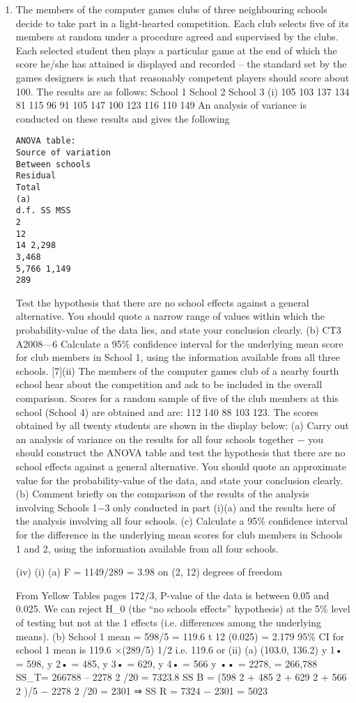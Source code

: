 \documentclass[a4paper,12pt]{article}
\begin{document}
\begin{enumerate}
\item The members of the computer games clubs of three neighbouring schools decide to take part in a light-hearted competition. Each club selects five of its members at random under a procedure agreed and supervised by the clubs. Each selected student
then plays a particular game at the end of which the score he/she has attained is displayed and recorded – the standard set by the games designers is such that reasonably competent players should score about 100.
The results are as follows:
School 1
School 2
School 3
(i)
105
103
137
134
81
115
96
91
105
147
100
123
116
110
149
An analysis of variance is conducted on these results and gives the following
\begin{verbatim}
ANOVA table:
Source of variation
Between schools
Residual
Total
(a)
d.f. SS MSS
2
12
14 2,298
3,468
5,766 1,149
289
\end{verbatim}
Test the hypothesis that there are no school effects against a general alternative.
You should quote a narrow range of values within which the probability-value of the data lies, and state your conclusion clearly.
(b)
CT3 A2008—6
Calculate a 95\% confidence interval for the underlying mean score for club members in School 1, using the information available from all
three schools.
[7](ii)
The members of the computer games club of a nearby fourth school hear about
the competition and ask to be included in the overall comparison. Scores for a random sample of five of the club members at this school (School 4) are
obtained and are:
112 140 88 103 123.
The scores obtained by all twenty students are shown in the display below:
(a)
Carry out an analysis of variance on the results for all four schools together − you should construct the ANOVA table and test the
hypothesis that there are no school effects against a general alternative.
You should quote an approximate value for the probability-value of the data, and state your conclusion clearly.
(b) Comment briefly on the comparison of the results of the analysis
involving Schools 1−3 only conducted in part (i)(a) and the results here of the analysis involving all four schools.
(c) Calculate a 95\% confidence interval for the difference in the underlying mean scores for club members in Schools 1 and 2, using the
information available from all four schools.

(iv)
(i)
(a)
F = 1149/289 = 3.98 on (2, 12) degrees of freedom

From Yellow Tables pages 172/3, P-value of the data is between 0.05 and 0.025.
We can reject H_0 (the “no schools effects” hypothesis) at the 5\% level of testing but not at the 1%
effects (i.e. differences among the underlying means).
(b)
School 1 mean = 598/5 = 119.6
t 12 (0.025) = 2.179
95\% CI for school 1 mean is 119.6 ×(289/5) 1/2
i.e. 119.6  or
(ii)
(a)
(103.0, 136.2)
y 1• = 598, y 2• = 485, y 3• = 629, y 4• = 566
y •• = 2278, = 266,788
SS_{T}= 266788 – 2278 2 /20 = 7323.8
SS B = (598 2 + 485 2 + 629 2 + 566 2 )/5 − 2278 2 /20 = 2301
⇒ SS R = 7324 − 2301 = 5023


\end{enumerate}
\end{document}
